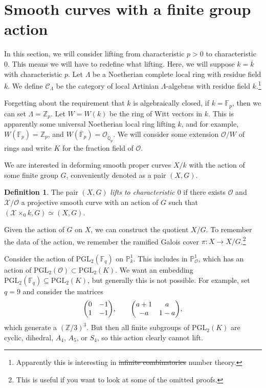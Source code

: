 \documentclass[leqno, openany]{memoir}
\theoremstyle{definition}
\newtheorem{defn}[thm]{Definition}
\theoremstyle{remark}
\theoremstyle{plain}
\theoremstyle{definition}
\theoremstyle{remark}
\newcommand{\F}{\mathbb{F}}
\newcommand{\Z}{\mathbb{Z}}
\newcommand{\Q}{\mathbb{Q}}
\renewcommand{\P}{\mathbb{P}}
\newcommand{\mc}[1]{\mathcal{#1}}
\newcommand{\mr}[1]{\mathrm{#1}}
\newcommand{\ol}[1]{\overline{#1}}
\begin{document}
\section{Smooth curves with a finite group action}%
\label{sec:smooth_curves_with_a_finite_group_action}

In this section, we will consider lifting from characteristic $p>0$ to characteristic $0$. This means we will have to redefine what lifting. Here, we will suppose $k = \ol{k}$ with characteristic $p$. Let $\Lambda$ be a Noetherian complete local ring with residue field $k$. We define $\mc{C}_{\Lambda}$ be the category of local Artinian $\Lambda$-algebras with residue field $k$.\footnote{Apparently this is interesting in \sout{infinite combinatorics} number theory.}

Forgetting about the requirement that $k$ is algebraically closed, if $k = \F_p$, then we can set $\Lambda = \Z_p$. Let $W = W(k)$ be the ring of Witt vectors in $k$. This is apparently some universal Noetherian local ring lifting $k$, and for example, $W(\F_p) = \Z_p$, and $W(\ol{\F}_p) = \mc{O}_{\check{\Q}_p}$. We will consider some extension $\mc{O}/W$ of rings and write $K$ for the fraction field of $\mc{O}$.

We are interested in deforming smooth proper curves $X/k$ with the action of some finite group $G$, conveniently denoted as a pair $(X, G)$.

\begin{defn}
    The pair $(X, G)$ \textit{lifts to characteristic $0$} if there exists $\mc{O}$ and $\mc{X} / \mc{O}$ a projective smooth curve with an action of $G$ such that $(\mc{X} \times_0 k, G) \simeq (X, G)$.
\end{defn}

Given the action of $G$ on $X$, we can construct the quotient $X/G$. To remember the data of the action, we remember the ramified Galois cover $\pi \colon X \to X/G$.\footnote{This is useful if you want to look at some of the omitted proofs.}

Consider the action of $\mr{PGL}_2(\F_q)$ on $\P^1_k$. This includes in $\P^1_{\mc{O}}$, which has an action of $\mr{PGL}_2(\mc{O}) \subset \mr{PGL}_2(K)$. We want an embedding $\mr{PGL}_2(\F_q) \subseteq \mr{PGL}_2(K)$, but generally this is not possible. For example, set $q = 9$ and consider the matrices
\[ \mqty(0 & -1 \\ 1 & -1), \qquad \mqty(a+1 & a \\ -a & 1-a), \]
which generate a $(\Z/3)^3$. But then all finite subgroups of $\mr{PGL}_2(K)$ are cyclic, dihedral, $A_4$, $A_5$, or $S_4$, so this action clearly cannot lift.
\end{document}
